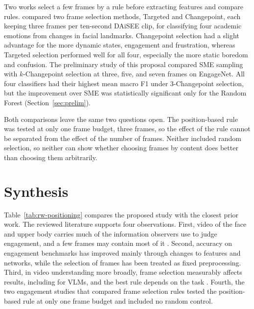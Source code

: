 Two works select a few frames by a rule before extracting features and compare rules.  compared two frame selection methods, Targeted and Changepoint, each keeping three frames per ten-second DAiSEE clip, for classifying four academic emotions from changes in facial landmarks. Changepoint selection had a slight advantage for the more dynamic states, engagement and frustration, whereas Targeted selection performed well for all four, especially the more static boredom and confusion. The preliminary study of this proposal \cite{sityar2026icce} compared SME sampling with $k$-Changepoint selection at three, five, and seven frames on EngageNet. All four classifiers had their highest mean macro F1 under 3-Changepoint selection, but the improvement over SME was statistically significant only for the Random Forest (Section~\ref{sec:prelim}).

Both comparisons leave the same two questions open. The position-based rule was tested at only one frame budget, three frames, so the effect of the rule cannot be separated from the effect of the number of frames. Neither included random selection, so neither can show whether choosing frames by content does better than choosing them arbitrarily.



\section{Synthesis}
\label{sec:rw-synthesis}

Table~\ref{tab:rw-positioning} compares the proposed study with the closest prior work. The reviewed literature supports four observations. First, video of the face and upper body carries much of the information observers use to judge engagement, and a few frames may contain most of it \cite{whitehill2014}. Second, accuracy on engagement benchmarks has improved mainly through changes to features and networks, while the selection of frames has been treated as fixed preprocessing. Third, in video understanding more broadly, frame selection measurably affects results, including for VLMs, and the best rule depends on the task \cite{brkic2025,tang2025aks}. Fourth, the two engagement studies that compared frame selection rules tested the position-based rule at only one frame budget and included no random control.

